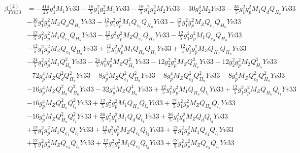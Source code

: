 \begin{align}
\beta_{TYv33}^{(2)} & =  
-\frac{414}{25} g_{1}^{4} M_1 Yv33 -\frac{18}{5} g_{1}^{2} g_{2}^{2} M_1 Yv33 -\frac{18}{5} g_{1}^{2} g_{2}^{2} M_2 Yv33 -30 g_{2}^{4} M_2 Yv33 -\frac{36}{5} g_{1}^{2} g_{p}^{2} M_1 Q_{d} Q_{H_u} Yv33 \nonumber \\ 
 &-\frac{36}{5} g_{1}^{2} g_{p}^{2} M_Z Q_{d} Q_{H_u} Yv33 -\frac{12}{5} g_{1}^{2} g_{p}^{2} M_1 Q_{e_{1}} Q_{H_u} Yv33 -\frac{12}{5} g_{1}^{2} g_{p}^{2} M_Z Q_{e_{1}} Q_{H_u} Yv33 \nonumber \\ 
 &-\frac{12}{5} g_{1}^{2} g_{p}^{2} M_1 Q_{e_{2}} Q_{H_u} Yv33 -\frac{12}{5} g_{1}^{2} g_{p}^{2} M_Z Q_{e_{2}} Q_{H_u} Yv33 -\frac{12}{5} g_{1}^{2} g_{p}^{2} M_1 Q_{e_3} Q_{H_u} Yv33 \nonumber \\ 
 &-\frac{12}{5} g_{1}^{2} g_{p}^{2} M_Z Q_{e_3} Q_{H_u} Yv33 +\frac{12}{5} g_{1}^{2} g_{p}^{2} M_1 Q_{H_d} Q_{H_u} Yv33 +\frac{12}{5} g_{1}^{2} g_{p}^{2} M_Z Q_{H_d} Q_{H_u} Yv33 \nonumber \\ 
 &-\frac{24}{5} g_{1}^{2} g_{p}^{2} M_1 Q_{H_u}^{2} Yv33 -\frac{24}{5} g_{1}^{2} g_{p}^{2} M_Z Q_{H_u}^{2} Yv33 -12 g_{2}^{2} g_{p}^{2} M_Z Q_{H_u}^{2} Yv33 -12 g_{2}^{2} g_{p}^{2} M_2 Q_{H_u}^{2} Yv33 \nonumber \\ 
 &-72 g_{p}^{4} M_Z Q_{d}^{2} Q_{H_u}^{2} Yv33 -8 g_{p}^{4} M_Z Q_{e_{1}}^{2} Q_{H_u}^{2} Yv33 -8 g_{p}^{4} M_Z Q_{e_{2}}^{2} Q_{H_u}^{2} Yv33 -8 g_{p}^{4} M_Z Q_{e_3}^{2} Q_{H_u}^{2} Yv33 \nonumber \\ 
 &-16 g_{p}^{4} M_Z Q_{H_d}^{2} Q_{H_u}^{2} Yv33 -32 g_{p}^{4} M_Z Q_{H_u}^{4} Yv33 +\frac{12}{5} g_{1}^{2} g_{p}^{2} M_1 Q_{H_u} Q_{l_1} Yv33 +\frac{12}{5} g_{1}^{2} g_{p}^{2} M_Z Q_{H_u} Q_{l_1} Yv33 \nonumber \\ 
 &-16 g_{p}^{4} M_Z Q_{H_u}^{2} Q_{l_1}^{2} Yv33 +\frac{12}{5} g_{1}^{2} g_{p}^{2} M_1 Q_{H_u} Q_{l_2} Yv33 +\frac{12}{5} g_{1}^{2} g_{p}^{2} M_Z Q_{H_u} Q_{l_2} Yv33 \nonumber \\ 
 &-16 g_{p}^{4} M_Z Q_{H_u}^{2} Q_{l_2}^{2} Yv33 +\frac{36}{5} g_{1}^{2} g_{p}^{2} M_1 Q_{d} Q_{l_3} Yv33 +\frac{36}{5} g_{1}^{2} g_{p}^{2} M_Z Q_{d} Q_{l_3} Yv33 \nonumber \\ 
 &+\frac{12}{5} g_{1}^{2} g_{p}^{2} M_1 Q_{e_{1}} Q_{l_3} Yv33 +\frac{12}{5} g_{1}^{2} g_{p}^{2} M_Z Q_{e_{1}} Q_{l_3} Yv33 +\frac{12}{5} g_{1}^{2} g_{p}^{2} M_1 Q_{e_{2}} Q_{l_3} Yv33 \nonumber \\ 
 &+\frac{12}{5} g_{1}^{2} g_{p}^{2} M_Z Q_{e_{2}} Q_{l_3} Yv33 +\frac{12}{5} g_{1}^{2} g_{p}^{2} M_1 Q_{e_3} Q_{l_3} Yv33 +\frac{12}{5} g_{1}^{2} g_{p}^{2} M_Z Q_{e_3} Q_{l_3} Yv33 \nonumber \\ 

\end{align}
